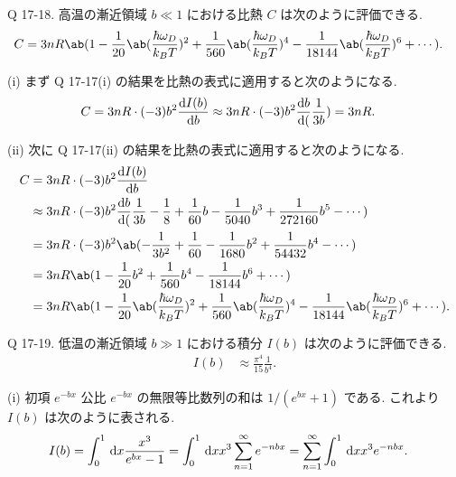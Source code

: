 \documentclass[uplatex,diffipdfmx,a4paper,11pt]{jlreq}
\theoremstyle{definition}
\begin{document}
\begin{itembox}[l]{Q 17-18.}
  高温の漸近領域 $b\ll 1$ における比熱 $C$ は次のように評価できる.
  \begin{align}
    C & = 3nR\ab(1 - \frac{1}{20}\ab(\frac{\hbar\omega_D}{k_BT})^2 + \frac{1}{560}\ab(\frac{\hbar\omega_D}{k_BT})^4 - \frac{1}{18144}\ab(\frac{\hbar\omega_D}{k_BT})^6 + \cdots).
  \end{align}
\end{itembox}

(i) まず Q 17-17(i) の結果を比熱の表式に適用すると次のようになる.
\begin{align}
  C & = 3nR\cdot (-3)b^2\diff{I(b)}{b} \approx 3nR\cdot (-3)b^2\diff{b}(\frac{1}{3b}) = 3nR.
\end{align}

(ii) 次に Q 17-17(ii) の結果を比熱の表式に適用すると次のようになる.
\begin{align}
  C & = 3nR\cdot (-3)b^2\diff{I(b)}{b}                                                                                                                                          \\
    & \approx 3nR\cdot (-3)b^2\diff{b}(\frac{1}{3b} - \frac{1}{8} + \frac{1}{60}b - \frac{1}{5040}b^3 + \frac{1}{272160}b^5 - \cdots)                                           \\
    & = 3nR\cdot (-3)b^2\ab(-\frac{1}{3b^2} + \frac{1}{60} - \frac{1}{1680}b^2 + \frac{1}{54432}b^4 - \cdots)                                                                   \\
    & = 3nR\ab(1 - \frac{1}{20}b^2 + \frac{1}{560}b^4 - \frac{1}{18144}b^6 + \cdots)                                                                                            \\
    & = 3nR\ab(1 - \frac{1}{20}\ab(\frac{\hbar\omega_D}{k_BT})^2 + \frac{1}{560}\ab(\frac{\hbar\omega_D}{k_BT})^4 - \frac{1}{18144}\ab(\frac{\hbar\omega_D}{k_BT})^6 + \cdots).
\end{align}

\begin{itembox}[l]{Q 17-19.}
  低温の漸近領域 $b\gg 1$ における積分 $I(b)$ は次のように評価できる.
  \begin{align}
    I(b) & \approx \frac{\pi^4}{15}\frac{1}{b^4}.
  \end{align}
\end{itembox}

(i)
初項 $e^{-bx}$ 公比 $e^{-bx}$ の無限等比数列の和は $1/(e^{bx} + 1)$ である. これより $I(b)$ は次のように表される.
\begin{align}
  I(b) & = \int_0^1\dl{x}\frac{x^3}{e^{bx} - 1} = \int_0^1\dl{x}x^3\sum_{n=1}^{\infty}e^{-nbx} = \sum_{n=1}^{\infty}\int_0^1\dl{x}x^3e^{-nbx}.
\end{align}
\end{document}
